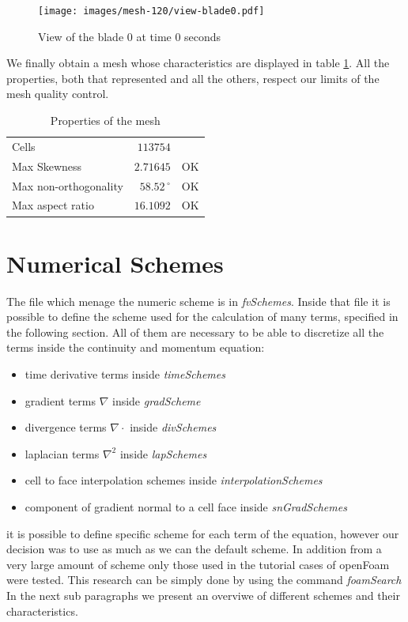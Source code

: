 \documentclass[a4paper,12pt]{article}
\begin{document}
\begin{figure}[H]
\centering
\texttt{[image: images/mesh-120/view-blade0.pdf]}
\caption{View of the blade 0 at time 0 seconds}
\end{figure}

We finally obtain a mesh whose characteristics are displayed in table \ref{table:mesh120}. All the properties, both that represented and all the others, respect our limits of the mesh quality control. 
\begin{table}[H]
\centering
\caption{Properties of the mesh}
\label{table:mesh120}
\begin{tabular}{lr|c}
\toprule
Cells                 & $113754$     &    \\
Max Skewness          & $2.71645$    & OK \\
Max non-orthogonality & $58.52\,^{\circ}$ & OK \\
Max aspect ratio      & $16.1092$    & OK \\ \bottomrule
\end{tabular}
\end{table} 

\section{Numerical Schemes}
The file which menage the numeric scheme is in \textit{fvSchemes}. Inside that file it is possible to define the scheme used for the calculation of many terms, specified in the following section. All of them are necessary to be able to discretize all the terms inside the continuity and momentum equation:
\begin{itemize} 
 \item time derivative terms inside \textit{timeSchemes}
 \item gradient terms $\nabla$ inside \textit{gradScheme}
 \item divergence terms $\nabla\cdot $ inside \textit{divSchemes}
 \item laplacian terms $\nabla^2$ inside \textit{lapSchemes}
 \item cell to face interpolation schemes  inside \textit{interpolationSchemes}
 \item component of gradient normal to a cell face  inside \textit{snGradSchemes}
 \end{itemize} 
it is possible to define specific scheme for each term of the equation, however our decision was to use as much as we can the default scheme. In addition from a very large amount of scheme only those used in the tutorial cases of openFoam were tested. This research can be simply done by using the command \textit{foamSearch} 
In the next sub paragraphs we present an overviwe of different schemes and their characteristics.
\end{document}
